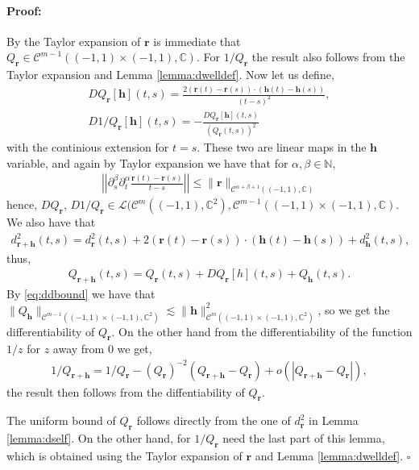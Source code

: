\documentclass{article}
\newenvironment{proof}{\paragraph{Proof:}}{\hfill$\square$}
\newcommand{\IC}{{\mathbb C}}
\newcommand{\IN}{{\mathbb N}}
\newcommand{\cmspace}[3]{\mathcal{C}^{#1} \left( #2, #3 \right)}
\newcommand{\bh}{\bm{h}}
\newcommand{\br}{\bm{r}}
\newcommand{\iinterv}{(-1,1)\times(-1,1)}
\begin{document}
\begin{proof}
By the Taylor expansion of $\br$  is immediate that  $Q_{\br} \in \cmspace{m-1}{(-1,1)\times(-1,1)}{\IC}$. For $1/Q_{\br}$ the result also follows from the Taylor expansion and Lemma \ref{lemma:dwelldef}.  Now let us define,
\begin{align*}
DQ_{\br}[\bh](t,s) = \frac{2 (\br(t)-\br(s))\cdot (\bh(t)-\bh(s))}{(t-s)^2}, \\
D1/Q_{\br}[\bh](t,s) = -\frac{DQ_{\br}[\bh](t,s)}{(Q_{\br}(t,s))^2} 
\end{align*}
with the continious extension for $t=s$. These two are linear maps in the $\bh$ variable, and again by Taylor expansion we have that for $\alpha, \beta \in \IN$, 
\begin{align}
\label{eq:ddbound}
\left\vert \left\vert \partial_s^\beta \partial_t^\alpha \frac{\br(t)-\br(s)}{t-s} \right \vert  \right \vert\leq \| \br \|_{\cmspace{\alpha+\beta+1}{(-1,1)}{\IC}}
\end{align}
hence, $DQ_{\br}$, $D1/Q_{\br} \in \mathcal{L}(\cmspace{m}{(-1,1)}{\IC^2}
  , \cmspace{m-1}{(-1,1)\times(-1,1)}{\IC}$.
We also have that 
\begin{align*}
d_{\br +\bh}^2(t,s) = d^2_{\br}(t,s) + 2 (\br(t) -\br(s))\cdot (\bh(t)-\bh(s)) + d_{\bh}^2(t,s),
\end{align*}
thus, 
\begin{align*}
Q_{\br +\bh}(t,s) = Q_{\br}(t,s) + DQ_{\br}[h](t,s) + Q_{\bh}(t,s).
\end{align*}
By \eqref{eq:ddbound} we have that $\| Q_{\bh}\|_{\cmspace{m-1}{\iinterv}{\IC^2}} \lesssim \| \bh\|_{\cmspace{m}{\iinterv}{\IC^2}}^2$, so we get the differentiability of $Q_{\br}$. On the other hand from the differentiability of the function $1/z$ for $z$ away from $0$ we get, 
\begin{align*}
1/Q_{\br+\bh} = 1/Q_{\br} - (Q_{\br})^{-2} (Q_{\br+\bh}-Q_{\br}) + o(|Q_{\br+\bh}-Q_{\br}|),
\end{align*}
the result then follows from the diffentiability of $Q_{\br}$.

The uniform bound of $Q_{\br}$ follows directly from the one of $d^2_{\br}$ in Lemma \ref{lemma:dself}. On the other hand, for $1/Q_{\br}$ need the last part of this lemma, which is obtained using the Taylor expansion of $\br$ and Lemma \ref{lemma:dwelldef}.
\end{proof}
\end{document}
